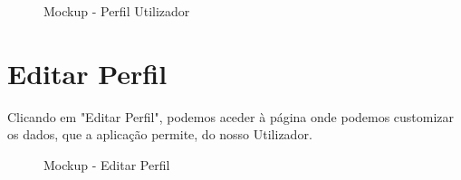 \documentclass[a4paper,12pt]{scrreprt}
\newcommand{\tab}{
    \hspace{1cm}}
\begin{document}
\begin{figure}[hbt!]
    \centering
    \caption{Mockup - Perfil Utilizador}
\end{figure}
\clearpage

\section{Editar Perfil}

\tab Clicando em "Editar Perfil", podemos aceder à página onde podemos customizar os dados, que a aplicação permite, do nosso Utilizador.

\vspace{1cm}

\begin{figure}[hbt!]
    \centering
    \caption{Mockup - Editar Perfil}
\end{figure}
\clearpage
\end{document}
